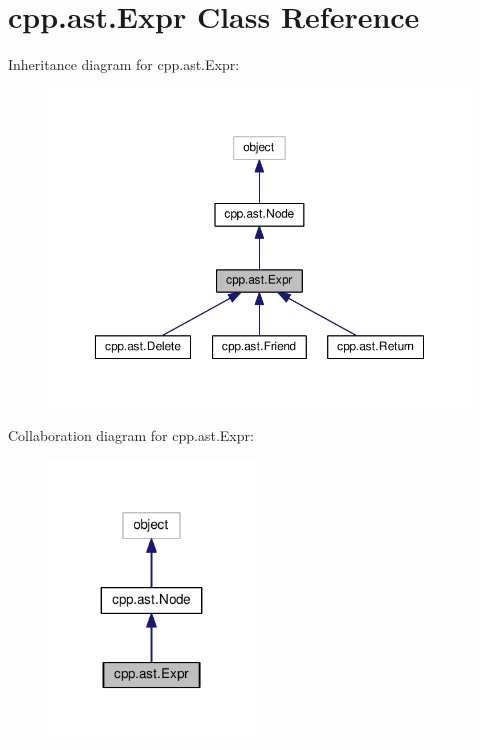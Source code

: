 \hypertarget{classcpp_1_1ast_1_1Expr}{}\section{cpp.\+ast.\+Expr Class Reference}
\label{classcpp_1_1ast_1_1Expr}


Inheritance diagram for cpp.\+ast.\+Expr\+:\nopagebreak
\begin{figure}[H]
\begin{center}
\leavevmode
\includegraphics[width=350pt]{classcpp_1_1ast_1_1Expr__inherit__graph}
\end{center}
\end{figure}


Collaboration diagram for cpp.\+ast.\+Expr\+:\nopagebreak
\begin{figure}[H]
\begin{center}
\leavevmode
\includegraphics[width=155pt]{classcpp_1_1ast_1_1Expr__coll__graph}
\end{center}
\end{figure}
